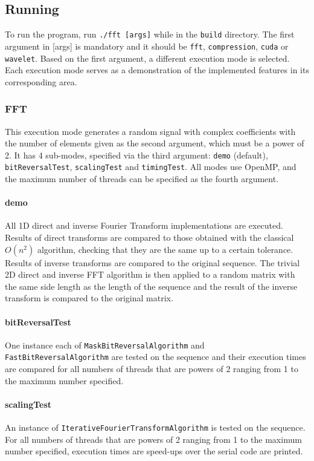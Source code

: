 \subsection{Running}
To run the program, run \texttt{./fft [args]} while in the \texttt{build} directory. The first argument in [args] is mandatory and it should be \texttt{fft}, \texttt{compression}, \texttt{cuda} or \texttt{wavelet}. Based on the first argument, a different execution mode is selected. Each execution mode serves as a demonstration of the implemented features in its corresponding area.

\subsubsection{FFT}
This execution mode generates a random signal with complex coefficients with the number of elements given as the second argument, which must be a power of 2. It has 4 sub-modes, specified via the third argument: \texttt{demo} (default), \texttt{bitReversalTest}, \texttt{scalingTest} and \texttt{timingTest}. All modes use OpenMP, and the maximum number of threads can be specified as the fourth argument.
\paragraph{demo} All 1D direct and inverse Fourier Transform implementations are executed. Results of direct transforms are compared to those obtained with the classical $O(n^2)$ algorithm, checking that they are the same up to a certain tolerance. Results of inverse transforms are compared to the original sequence. The trivial 2D direct and inverse FFT algorithm is then applied to a random matrix with the same side length as the length of the sequence and the result of the inverse transform is compared to the original matrix.
\paragraph{bitReversalTest} One instance each of \texttt{Mask\-Bit\-Reversal\-Algorithm} and \texttt{Fast\-Bit\-Reversal\-Algorithm} are tested on the sequence and their execution times are compared for all numbers of threads that are powers of 2 ranging from 1 to the maximum number specified.
\paragraph{scalingTest} An instance of \texttt{Iterative\-Fourier\-Transform\-Algorithm} is tested on the sequence. For all numbers of threads that are powers of 2 ranging from 1 to the maximum number specified, execution times are speed-ups over the serial code are printed.
